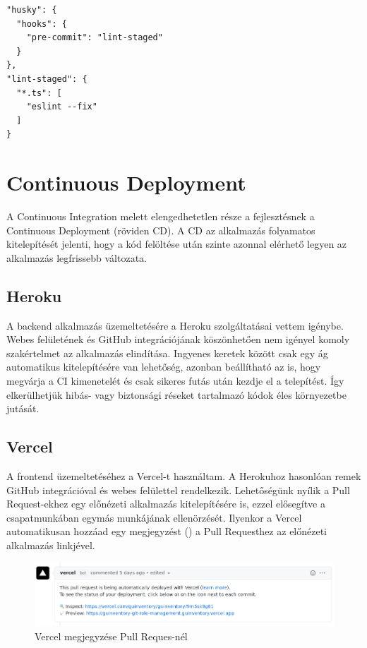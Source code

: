 \begin{lstlisting}[style=ES6, caption=Pre-commit hook beállításai]    
"husky": {
  "hooks": {
    "pre-commit": "lint-staged"
  }
},
"lint-staged": {
  "*.ts": [
    "eslint --fix"
  ]
}
\end{lstlisting}
  

\section{Continuous Deployment}
A Continuous Integration melett elengedhetetlen része a fejlesztésnek a Continuous Deployment (röviden CD).
A CD az alkalmazás folyamatos kitelepítését jelenti, hogy a kód felöltése után szinte azonnal elérhető legyen az alkalmazás legfrissebb változata.


\subsection{Heroku}
A backend alkalmazás üzemeltetésére a Heroku szolgáltatásai vettem igénybe.
Webes felületének és GitHub integrációjának köszönhetően nem igényel komoly szakértelmet az alkalmazás elindítása.
Ingyenes keretek között csak egy ág automatikus kitelepítésére van lehetőség, azonban beállítható az is, hogy megvárja a CI kimenetelét és csak sikeres futás után kezdje el a telepítést.
Így elkerülhetjük hibás- vagy biztonsági réseket tartalmazó kódok éles környezetbe jutását.


\subsection{Vercel}
A frontend üzemeltetéséhez a Vercel-t használtam. 
A Herokuhoz hasonlóan remek GitHub integrációval és webes felülettel rendelkezik. 
Lehetőségünk nyílik a Pull Request-ekhez egy előnézeti alkalmazás kitelepítésére is, ezzel elősegítve a csapatmunkában egymás munkájának ellenörzését.
Ilyenkor a Vercel automatikusan hozzáad egy megjegyzést () a Pull Requesthez az előnézeti alkalmazás linkjével.

\begin{figure}[!ht]
  \centering
  \includegraphics[width=150mm, keepaspectratio]{figures/vercel.png}
  \caption{Vercel megjegyzése Pull Reques-nél}
  \label{fig:vercel}
\end{figure}


